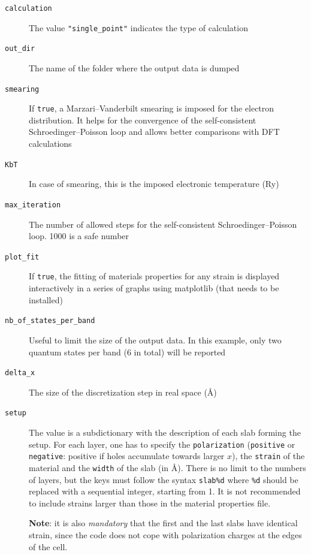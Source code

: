 \documentclass[a4paper,12pt]{article}
\newcommand{\angstrom}{\textup{\AA}}
\begin{document}
\begin{description}
\item[\texttt{calculation}] The value \texttt{"single\_point"} indicates the type of calculation

\item[\texttt{out\_dir}] The name of the folder where the output data is dumped

\item[\texttt{smearing}] If \texttt{true}, a Marzari--Vanderbilt smearing is imposed for the electron distribution. It helps for the convergence of the self-consistent Schroedinger--Poisson loop and allows better comparisons with DFT calculations

\item[\texttt{KbT}] In case of smearing, this is the imposed electronic temperature (Ry)

\item[\texttt{max\_iteration}] The number of allowed steps for the self-consistent Schroedinger--Poisson loop. 1000 is a safe number

\item[\texttt{plot\_fit}] If \texttt{true}, the fitting of materials properties for any strain is displayed interactively in a series of graphs using matplotlib (that needs to be installed)

\item[\texttt{nb\_of\_states\_per\_band}] Useful to limit the size of the output data. In this example, only two quantum states per band (6 in total) will be reported

\item[\texttt{delta\_x}] The size of the discretization step in real space (\angstrom)

\item[\texttt{setup}] The value is a subdictionary with the description of each slab forming the setup. For each layer, one has to specify the \texttt{polarization} (\texttt{positive} or \texttt{negative}: positive if holes accumulate towards larger $x$), the \texttt{strain} of the material and the \texttt{width} of the slab (in \angstrom). There is no limit to the numbers of layers, but the keys must follow the syntax \texttt{slab\%d} where \texttt{\%d} should be replaced with a sequential integer, starting from 1. It is not recommended to include strains larger than those in the material properties file. 

\textbf{Note}: it is also \emph{mandatory} that the first and the last slabs have identical strain, since the code does not cope with polarization charges at the edges of the cell.
\end{description}
\end{document}
